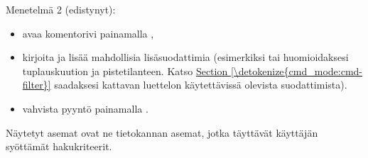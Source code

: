\documentclass[letterpaper,10pt,finnish]{sphinxmanual}
\begin{document}
\sphinxAtStartPar
Menetelmä 2 (edistynyt):
\begin{itemize}
\item {} 
\sphinxAtStartPar
avaa komentorivi painamalla ,

\item {} 
\sphinxAtStartPar
kirjoita  ja lisää mahdollisia lisäsuodattimia (esimerkiksi  tai  huomioidaksesi tuplauskuution ja pistetilanteen. Katso \hyperref[\detokenize{cmd_mode:cmd-filter}]{Section \ref{\detokenize{cmd_mode:cmd-filter}}} saadaksesi kattavan luettelon käytettävissä olevista suodattimista).

\item {} 
\sphinxAtStartPar
vahvista pyyntö painamalla .

\end{itemize}

\sphinxAtStartPar
Näytetyt asemat ovat ne tietokannan asemat, jotka täyttävät käyttäjän syöttämät hakukriteerit.
\end{document}
